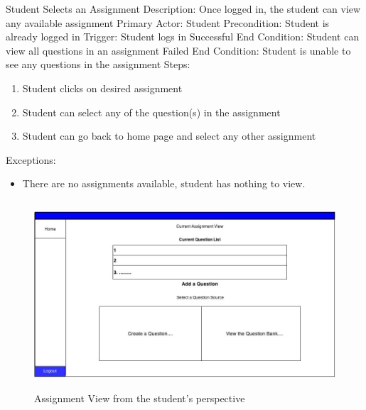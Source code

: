     \begin{section}{Student Selects an Assignment}
        Description: Once logged in, the student can view any available assignment \newline
        Primary Actor: Student \newline
        Precondition: Student is already logged in \newline
        Trigger: Student logs in \newline
        Successful End Condition: Student can view all questions in an assignment \newline
        Failed End Condition: Student is unable to see any questions in the assignment \newline
        \newline
        Steps:
        \begin{enumerate}
            \item{Student clicks on desired assignment}
            \item{Student can select any of the question(s) in the assignment}
            \item{Student can go back to home page and select any other assignment}
        \end{enumerate}
        Exceptions:
        \begin{itemize}
            \item{There are no assignments available, student has nothing to view.}
        \end{itemize}
            \begin{figure}[H]
            \centerline{\includegraphics[height=7cm]{AssignmentView.jpg}}
            \caption{Assignment View from the student's perspective}
    \end{figure}
    \end{section}
    
